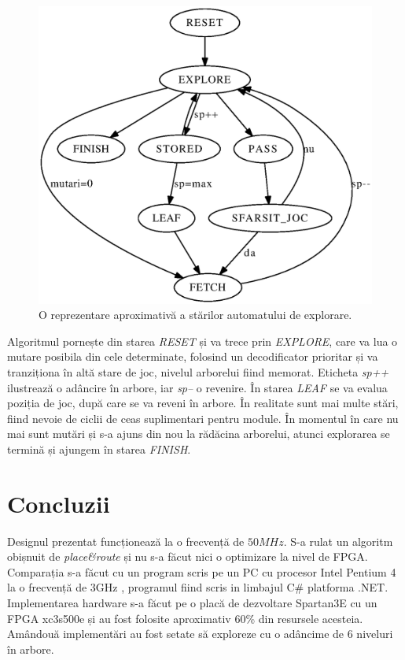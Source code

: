 \documentclass[11pt,twocolumn,a4paper]{article}
\begin{document}
\begin{figure}[h]
\includegraphics*[scale = 0.4]{aut00.ps}
\caption{\small{O reprezentare aproximativă a stărilor automatului de explorare.}}
\label{fig:fig_aut}
\end{figure}

Algoritmul pornește din starea \emph{RESET} și va trece prin \emph{EXPLORE}, care va lua o mutare posibila din cele determinate, folosind un decodificator prioritar și va tranziționa în altă stare de joc, nivelul arborelui fiind memorat. Eticheta \emph{sp++} ilustrează o adâncire în arbore, iar \emph{sp--} o revenire. În starea \emph{LEAF} se va evalua poziția de joc, după care se va reveni în arbore. În realitate sunt mai multe stări, fiind nevoie de ciclii de ceas suplimentari pentru module. În momentul în care nu mai sunt mutări și s-a ajuns din nou la rădăcina arborelui, atunci explorarea se termină și ajungem în starea \emph{FINISH}.
\section*{Concluzii}
Designul prezentat funcționează la o frecvență de $50MHz$. S-a rulat un algoritm obișnuit de \emph{place\&route} și nu s-a făcut nici o optimizare la nivel de FPGA. Comparația s-a făcut cu un program scris pe un PC cu procesor Intel Pentium 4 la o frecvență de 3GHz , programul fiind scris in limbajul C\# platforma .NET. Implementarea hardware s-a făcut pe o placă de dezvoltare Spartan3E cu un FPGA xc3s500e și au fost folosite aproximativ 60\% din resursele acesteia. Amândouă implementări au fost setate să exploreze cu o adâncime de $6$ niveluri în arbore. 
\end{document}
